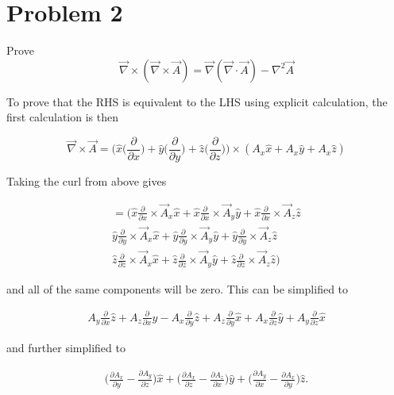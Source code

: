 \documentclass[11pt]{article}
\begin{document}
\clearpage

\section*{Problem 2}

Prove 
$$
\vec{\nabla} \times (\vec{\nabla} \times \vec{A}) 
= \vec{\nabla}(\vec{\nabla} \cdot \vec{A}) - \nabla^{2}\vec{A}
$$

To prove that the RHS is equivalent to the LHS using explicit calculation, the first calculation is then

$$
\vec{\nabla} \times \vec{A} = \Big( \hat{x}\Big(\frac{\partial}{\partial x} \Big) + \hat{y}\Big(\frac{\partial}{\partial y} \Big) + \hat{z}\Big(\frac{\partial}{\partial z} \Big)\Big) \times (A_{x}\hat{x} + A_{x}\hat{y} + A_{x}\hat{z})
$$

Taking the curl from above gives

\begin{eqnarray*}
= ( 
\hat{x}\frac{\partial}{\partial x} \times \vec{A}_{x}\hat{x} + \hat{x}\frac{\partial}{\partial x} \times \vec{A}_{y}\hat{y} + \hat{x}\frac{\partial}{\partial x} \times \vec{A}_{z}\hat{z} \\
\hat{y}\frac{\partial}{\partial y} \times \vec{A}_{x}\hat{x} + \hat{y}\frac{\partial}{\partial y} \times \vec{A}_{y}\hat{y} + \hat{y}\frac{\partial}{\partial y} \times \vec{A}_{z}\hat{z} \\
\hat{z}\frac{\partial}{\partial z}  \times \vec{A}_{x}\hat{x} + \hat{z}\frac{\partial}{\partial z}  \times \vec{A}_{y}\hat{y} + \hat{z}\frac{\partial}{\partial z}  \times \vec{A}_{z}\hat{z} 
) 
\end{eqnarray*}

and all of the same components will be zero. This can be simplified to 

\begin{eqnarray*}
A_{y}\frac{\partial}{\partial x}\hat{z} + A_{z}\frac{\partial}{\partial x}\hat{y} - A_{x}\frac{\partial}{\partial y}\hat{z} + A_{z}\frac{\partial}{\partial y}\hat{x} + A_{x}\frac{\partial}{\partial z}\hat{y} + A_{y}\frac{\partial}{\partial z}\hat{x}
\end{eqnarray*}

and further simplified to 

\begin{eqnarray*}
\Big(\frac{\partial A_{x}}{\partial y} - \frac{\partial A_{y}}{\partial z}\Big) \hat{x} + \Big(\frac{\partial A_{x}}{\partial z} - \frac{\partial A_{z}}{\partial x}\Big) \hat{y} +
\Big(\frac{\partial A_{y}}{\partial x} - \frac{\partial A_{x}}{\partial y}\Big) \hat{z}.
\end{eqnarray*}
\end{document}
